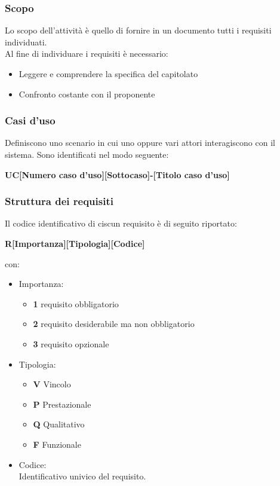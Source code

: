     \subsubsection{Scopo}
    Lo scopo dell'attività è quello di fornire in un documento tutti i requisiti individuati.\\
    Al fine di individuare i requisiti è necessario:
    \begin{itemize}
      \item Leggere e comprendere la specifica del capitolato
      \item Confronto costante con il proponente
    \end{itemize}
    \subsubsection{Casi d'uso}
    Definiscono uno scenario in cui uno oppure vari attori interagiscono con il sistema. Sono identificati nel modo seguente:
    \begin{center}
      \textbf{UC[Numero caso d'uso][Sottocaso]-[Titolo caso d'uso]}\\
    \end{center}
    \subsubsection{Struttura dei requisiti}
      Il codice identificativo di ciscun requisito è di seguito riportato:
      \begin{center}
        \textbf{R[Importanza][Tipologia][Codice]}\\
      \end{center}
      con:
      \begin{itemize}
        \item Importanza: 
        \begin{itemize}
          \item \textbf{1} requisito obbligatorio
          \item \textbf{2} requisito desiderabile ma non obbligatorio
          \item \textbf{3} requisito opzionale
        \end{itemize}
  
        \item Tipologia: 
        \begin{itemize}
          \item \textbf{V} Vincolo
          \item \textbf{P} Prestazionale
          \item \textbf{Q} Qualitativo
          \item \textbf{F} Funzionale
        \end{itemize}
  
        \item Codice:\\
        Identificativo univico del requisito.
      \end{itemize}

